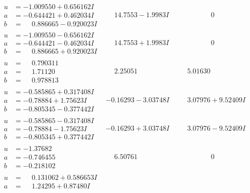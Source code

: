 \documentclass[1p]{elsarticle_modified}
\theoremstyle{definition}
\begin{document}
$$\begin{array}{c|c|c}
\begin{aligned}
u &= -1.009550 + 0.656162 I \\
a &= -0.644421 + 0.462034 I \\
b &= \phantom{-}0.886665 - 0.920023 I\end{aligned}
 & \phantom{-}14.7553 - 1.9983 I & \phantom{-0.000000 } 0 \\ \hline\begin{aligned}
u &= -1.009550 - 0.656162 I \\
a &= -0.644421 - 0.462034 I \\
b &= \phantom{-}0.886665 + 0.920023 I\end{aligned}
 & \phantom{-}14.7553 + 1.9983 I & \phantom{-0.000000 } 0 \\ \hline\begin{aligned}
u &= \phantom{-}0.790311\phantom{ +0.000000I} \\
a &= \phantom{-}1.71120\phantom{ +0.000000I} \\
b &= \phantom{-}0.978813\phantom{ +0.000000I}\end{aligned}
 & \phantom{-}2.25051\phantom{ +0.000000I} & \phantom{-}5.01630\phantom{ +0.000000I} \\ \hline\begin{aligned}
u &= -0.585865 + 0.317408 I \\
a &= -0.78884 + 1.75623 I \\
b &= -0.805345 - 0.377442 I\end{aligned}
 & -0.16293 - 3.03748 I & \phantom{-}3.07976 + 9.52409 I \\ \hline\begin{aligned}
u &= -0.585865 - 0.317408 I \\
a &= -0.78884 - 1.75623 I \\
b &= -0.805345 + 0.377442 I\end{aligned}
 & -0.16293 + 3.03748 I & \phantom{-}3.07976 - 9.52409 I \\ \hline\begin{aligned}
u &= -1.37682\phantom{ +0.000000I} \\
a &= -0.746455\phantom{ +0.000000I} \\
b &= -0.218102\phantom{ +0.000000I}\end{aligned}
 & \phantom{-}6.50761\phantom{ +0.000000I} & \phantom{-0.000000 } 0 \\ \hline\begin{aligned}
u &= \phantom{-}0.131062 + 0.586653 I \\
a &= \phantom{-}1.24295 + 0.87480 I \\

\end{aligned}
\end{array}$$
\end{document}
